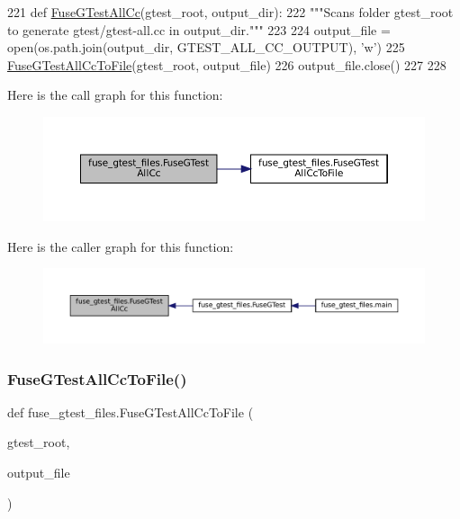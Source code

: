 \begin{DoxyCode}
221 \textcolor{keyword}{def }\hyperlink{namespacefuse__gtest__files_a9bcdfab09f297e2b2097d9cdde5ee092}{FuseGTestAllCc}(gtest\_root, output\_dir):
222   \textcolor{stringliteral}{"""Scans folder gtest\_root to generate gtest/gtest-all.cc in output\_dir."""}
223 
224   output\_file = open(os.path.join(output\_dir, GTEST\_ALL\_CC\_OUTPUT), \textcolor{stringliteral}{'w'})
225   \hyperlink{namespacefuse__gtest__files_ae0209897b164dbb8702169630f4bbf61}{FuseGTestAllCcToFile}(gtest\_root, output\_file)
226   output\_file.close()
227 
228 
\end{DoxyCode}
Here is the call graph for this function\+:
\nopagebreak
\begin{figure}[H]
\begin{center}
\leavevmode
\includegraphics[width=350pt]{namespacefuse__gtest__files_a9bcdfab09f297e2b2097d9cdde5ee092_cgraph}
\end{center}
\end{figure}
Here is the caller graph for this function\+:
\nopagebreak
\begin{figure}[H]
\begin{center}
\leavevmode
\includegraphics[width=350pt]{namespacefuse__gtest__files_a9bcdfab09f297e2b2097d9cdde5ee092_icgraph}
\end{center}
\end{figure}
\mbox{\label{namespacefuse__gtest__files_ae0209897b164dbb8702169630f4bbf61}} 
\subsubsection{\texorpdfstring{Fuse\+G\+Test\+All\+Cc\+To\+File()}{FuseGTestAllCcToFile()}}
{\footnotesize\ttfamily def fuse\+\_\+gtest\+\_\+files.\+Fuse\+G\+Test\+All\+Cc\+To\+File (\begin{DoxyParamCaption}\item[{}]{gtest\+\_\+root,  }\item[{}]{output\+\_\+file }\end{DoxyParamCaption})}

